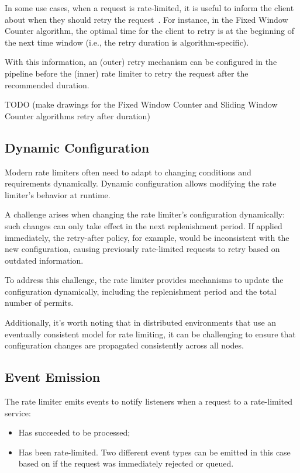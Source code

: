 In some use cases, when a request is rate-limited, it is useful to inform the client about when they should retry the request~\cite{mdn-retry-after}.
For instance, in the Fixed Window Counter algorithm,
the optimal time for the client to retry is at the beginning of the next time window
(i.e., the retry duration is algorithm-specific).

With this information,
an (outer) retry mechanism can be configured in the pipeline before the
(inner) rate limiter to retry the request after the recommended duration.

TODO (make drawings for the Fixed Window Counter and Sliding Window Counter algorithms retry after duration)

\subsection{Dynamic Configuration}\label{subsec:rate-limiter-dynamic-configuration}

Modern rate limiters often need to adapt to changing conditions and requirements dynamically.
Dynamic configuration allows modifying the rate limiter's behavior at runtime.

A challenge arises when changing the rate limiter's configuration dynamically: such changes can only take effect in
the next replenishment period.
If applied immediately, the retry-after policy, for example, would be inconsistent with the new configuration,
causing previously rate-limited requests to retry based on outdated information.

To address this challenge, the rate limiter provides mechanisms to update the configuration dynamically, including the
replenishment period and the total number of permits.

Additionally, it's worth noting that in distributed environments that use an eventually consistent model for rate limiting,
it can be challenging to ensure that configuration changes are propagated consistently across all nodes.

\subsection{Event Emission}\label{subsec:rate-limiter-event-emission}

The rate limiter emits events to notify listeners when a request to a rate-limited service:

\begin{itemize}
    \item Has succeeded to be processed;
    \item Has been rate-limited.
    Two different event types can be emitted in this case based on if the request was immediately rejected or queued.
\end{itemize}


